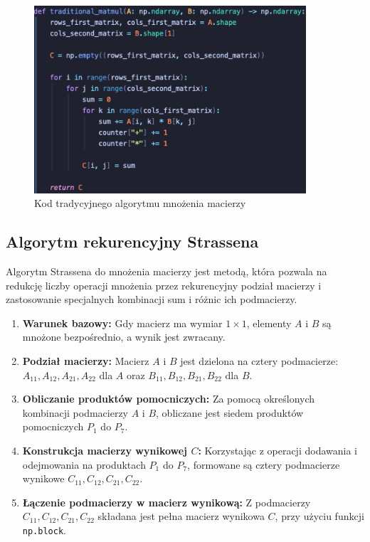 \documentclass{article}
\begin{document}
\begin{figure}[h]
  \centering
  \includegraphics[width=0.9\textwidth]{traditional_matmul.png}
  \caption{Kod tradycyjnego algorytmu mnożenia macierzy}
\end{figure}

\subsection{Algorytm rekurencyjny Strassena}

Algorytm Strassena do mnożenia macierzy jest metodą, która pozwala na redukcję liczby operacji mnożenia przez
rekurencyjny podział macierzy i zastosowanie specjalnych kombinacji sum i różnic ich podmacierzy.

\begin{enumerate}
    \item \textbf{Warunek bazowy:} Gdy macierz ma wymiar $1 \times 1$, elementy $A$ i $B$ są mnożone bezpośrednio, a wynik jest zwracany.
    \item \textbf{Podział macierzy:} Macierz $A$ i $B$ jest dzielona na cztery podmacierze: $A_{11}, A_{12}, A_{21}, A_{22}$ dla $A$ oraz $B_{11}, B_{12}, B_{21}, B_{22}$ dla $B$.
    \item \textbf{Obliczanie produktów pomocniczych:} Za pomocą określonych kombinacji podmacierzy $A$ i $B$, obliczane jest siedem produktów pomocniczych $P_1$ do $P_7$.
    \item \textbf{Konstrukcja macierzy wynikowej $C$:} Korzystając z operacji dodawania i odejmowania na produktach $P_1$ do $P_7$, formowane są cztery podmacierze wynikowe $C_{11}, C_{12}, C_{21}, C_{22}$.
    \item \textbf{Łączenie podmacierzy w macierz wynikową:} Z podmacierzy $C_{11}, C_{12}, C_{21}, C_{22}$ składana jest pełna macierz wynikowa $C$, przy użyciu funkcji \texttt{np.block}.
\end{enumerate}
\end{document}
